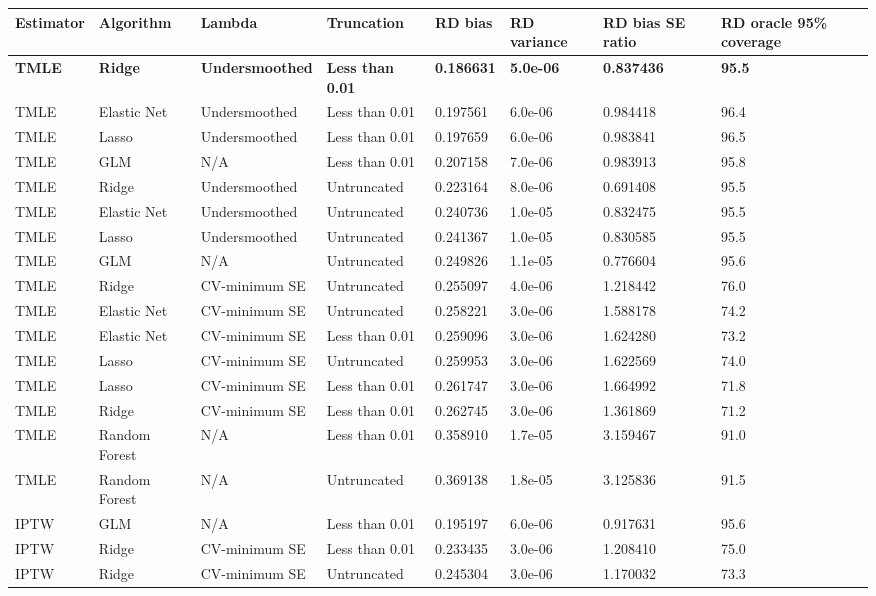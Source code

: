 
\begin{longtable}[l]{llllllll}
\toprule
Estimator & Algorithm & Lambda & Truncation & RD bias & RD variance & RD bias SE ratio & RD oracle 95\% coverage\\
\midrule
\midrule
\textbf{TMLE} & \textbf{Ridge} & \textbf{Undersmoothed} & \textbf{Less than 0.01} & \textbf{0.186631} & \textbf{5.0e-06} & \textbf{0.837436} & \textbf{95.5}\\
\midrule
TMLE & Elastic Net & Undersmoothed & Less than 0.01 & 0.197561 & 6.0e-06 & 0.984418 & 96.4\\
TMLE & Lasso & Undersmoothed & Less than 0.01 & 0.197659 & 6.0e-06 & 0.983841 & 96.5\\
TMLE & GLM & N/A & Less than 0.01 & 0.207158 & 7.0e-06 & 0.983913 & 95.8\\
TMLE & Ridge & Undersmoothed & Untruncated & 0.223164 & 8.0e-06 & 0.691408 & 95.5\\
TMLE & Elastic Net & Undersmoothed & Untruncated & 0.240736 & 1.0e-05 & 0.832475 & 95.5\\
TMLE & Lasso & Undersmoothed & Untruncated & 0.241367 & 1.0e-05 & 0.830585 & 95.5\\
TMLE & GLM & N/A & Untruncated & 0.249826 & 1.1e-05 & 0.776604 & 95.6\\
TMLE & Ridge & CV-minimum SE & Untruncated & 0.255097 & 4.0e-06 & 1.218442 & 76.0\\
TMLE & Elastic Net & CV-minimum SE & Untruncated & 0.258221 & 3.0e-06 & 1.588178 & 74.2\\
TMLE & Elastic Net & CV-minimum SE & Less than 0.01 & 0.259096 & 3.0e-06 & 1.624280 & 73.2\\
TMLE & Lasso & CV-minimum SE & Untruncated & 0.259953 & 3.0e-06 & 1.622569 & 74.0\\
TMLE & Lasso & CV-minimum SE & Less than 0.01 & 0.261747 & 3.0e-06 & 1.664992 & 71.8\\
TMLE & Ridge & CV-minimum SE & Less than 0.01 & 0.262745 & 3.0e-06 & 1.361869 & 71.2\\
TMLE & Random Forest & N/A & Less than 0.01 & 0.358910 & 1.7e-05 & 3.159467 & 91.0\\
TMLE & Random Forest & N/A & Untruncated & 0.369138 & 1.8e-05 & 3.125836 & 91.5\\
IPTW & GLM & N/A & Less than 0.01 & 0.195197 & 6.0e-06 & 0.917631 & 95.6\\
IPTW & Ridge & CV-minimum SE & Less than 0.01 & 0.233435 & 3.0e-06 & 1.208410 & 75.0\\
IPTW & Ridge & CV-minimum SE & Untruncated & 0.245304 & 3.0e-06 & 1.170032 & 73.3\\

\end{longtable}

